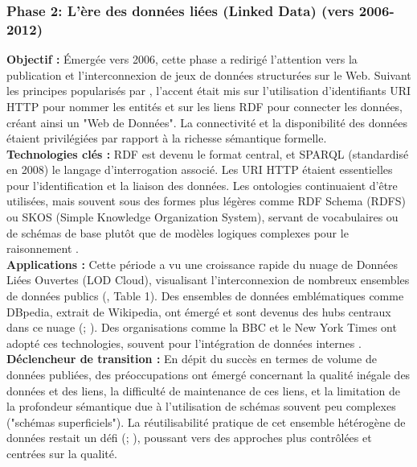 \documentclass[9pt,twocolumn,twoside,french]{opticajnl}
\begin{document}
\subsubsection{Phase 2: L'ère des données liées (Linked Data) (vers 2006-2012)}
\textbf{Objectif :} Émergée vers 2006, cette phase a redirigé l'attention vers la publication et l'interconnexion de jeux de données structurées sur le Web. Suivant les principes popularisés par \citet{Bizer2009Linked}, l'accent était mis sur l'utilisation d'identifiants URI HTTP pour nommer les entités et sur les liens RDF pour connecter les données, créant ainsi un "Web de Données". La connectivité et la disponibilité des données étaient privilégiées par rapport à la richesse sémantique formelle. \\
\textbf{Technologies clés :} RDF est devenu le format central, et SPARQL (standardisé en 2008) le langage d'interrogation associé. Les URI HTTP étaient essentielles pour l'identification et la liaison des données. Les ontologies continuaient d'être utilisées, mais souvent sous des formes plus légères comme RDF Schema (RDFS) ou SKOS (Simple Knowledge Organization System), servant de vocabulaires ou de schémas de base plutôt que de modèles logiques complexes pour le raisonnement \citep{Hitzler2021}. \\
\textbf{Applications :} Cette période a vu une croissance rapide du nuage de Données Liées Ouvertes (LOD Cloud), visualisant l'interconnexion de nombreux ensembles de données publics (\citealp{Hitzler2021}, Table 1). Des ensembles de données emblématiques comme DBpedia, extrait de Wikipedia, ont émergé et sont devenus des hubs centraux dans ce nuage (\citealp{Lehmann2015Dbpediaa}; \citealp{Hitzler2021}). Des organisations comme la BBC et le New York Times ont adopté ces technologies, souvent pour l'intégration de données internes \citep{Hitzler2021}. \\
\textbf{Déclencheur de transition :} En dépit du succès en termes de volume de données publiées, des préoccupations ont émergé concernant la qualité inégale des données et des liens, la difficulté de maintenance de ces liens, et la limitation de la profondeur sémantique due à l'utilisation de schémas souvent peu complexes ("schémas superficiels"). La réutilisabilité pratique de cet ensemble hétérogène de données restait un défi (\citealp{Jain2010}; \citealp{Hitzler2021}), poussant vers des approches plus contrôlées et centrées sur la qualité.
\end{document}
